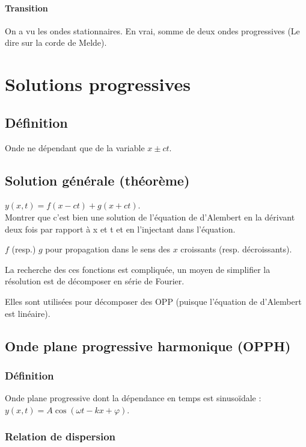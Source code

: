 \documentclass[11pt]{report}
\numberwithin{figure}{section}
\numberwithin{equation}{section}
\numberwithin{table}{section}
\newcommand{\1}{\boldsymbol{1}}
\begin{document}
\paragraph{Transition} On a vu les ondes stationnaires. En vrai, somme de deux ondes progressives (Le dire sur la corde de Melde).

\section{Solutions progressives}

\subsection{Définition}

Onde ne dépendant que de la variable $x \pm ct$.

\subsection{Solution générale (théorème)}

$y(x,t) = f(x-ct) + g(x+ct)$. \\

Montrer que c'est bien une solution de l'équation de d'Alembert en la dérivant deux
fois par rapport à x et t et en l'injectant dans l'équation.

$f$ (resp.) $g$ pour propagation dans le sens des $x$ croissants (resp. décroissants).

La recherche des ces fonctions est compliquée, un moyen de simplifier la résolution est de décomposer en série de Fourier.

Elles sont utilisées pour décomposer des OPP (puisque l'équation de d'Alembert est linéaire).


\subsection{Onde plane progressive harmonique (OPPH)}

\subsubsection{Définition}
Onde plane progressive dont la dépendance en temps est sinusoïdale : $y(x,t) = A \cos(\omega t - kx + \varphi)$.

\subsubsection{Relation de dispersion}
\end{document}
